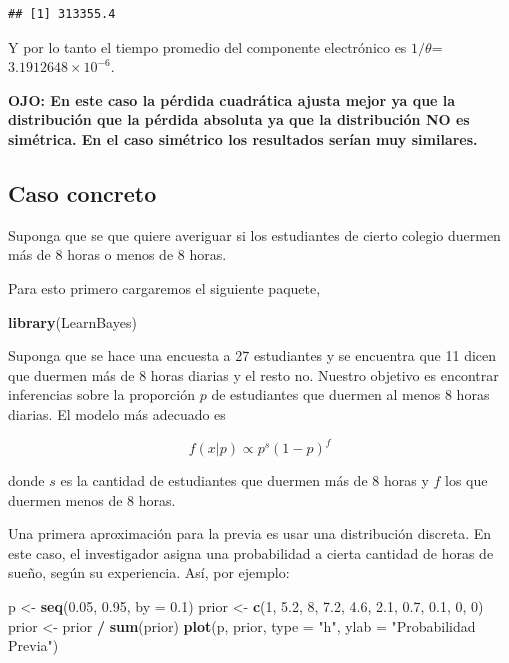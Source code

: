 \documentclass[
  12pt,
]{book}
\newenvironment{Shaded}{\begin{snugshade}}{\end{snugshade}}
\newcommand{\DataTypeTok}[1]{\textcolor[rgb]{0.13,0.29,0.53}{#1}}
\newcommand{\DecValTok}[1]{\textcolor[rgb]{0.00,0.00,0.81}{#1}}
\newcommand{\FloatTok}[1]{\textcolor[rgb]{0.00,0.00,0.81}{#1}}
\newcommand{\KeywordTok}[1]{\textcolor[rgb]{0.13,0.29,0.53}{\textbf{#1}}}
\newcommand{\NormalTok}[1]{#1}
\newcommand{\OperatorTok}[1]{\textcolor[rgb]{0.81,0.36,0.00}{\textbf{#1}}}
\newcommand{\StringTok}[1]{\textcolor[rgb]{0.31,0.60,0.02}{#1}}
\begin{document}
\begin{verbatim}
## [1] 313355.4
\end{verbatim}

Y por lo tanto el tiempo promedio del componente electrónico es \(1/\theta\)=\ensuremath{3.1912648\times 10^{-6}}.

\textbf{OJO: En este caso la pérdida cuadrática ajusta mejor ya que la distribución que la pérdida absoluta ya que la distribución NO es simétrica. En el caso simétrico los resultados serían muy similares.}

\hypertarget{caso-concreto}{%
\subsection{Caso concreto}\label{caso-concreto}}

Suponga que se que quiere averiguar si los estudiantes de cierto colegio duermen más de 8 horas o menos de 8 horas.

Para esto primero cargaremos el siguiente paquete,

\begin{Shaded}
\begin{Highlighting}[]
\KeywordTok{library}\NormalTok{(LearnBayes)}
\end{Highlighting}
\end{Shaded}

Suponga que se hace una encuesta a 27 estudiantes y se encuentra que 11 dicen que duermen más de 8 horas diarias y el resto no. Nuestro objetivo es encontrar inferencias sobre la proporción \(p\) de estudiantes que duermen al menos 8 horas diarias. El modelo más adecuado es

\[
f(x \vert p) \propto p^s (1-p)^f
\]

donde \(s\) es la cantidad de estudiantes que duermen más de 8 horas y \(f\) los que duermen menos de 8 horas.

Una primera aproximación para la previa es usar una distribución discreta. En este caso, el investigador asigna una probabilidad a cierta cantidad de horas de sueño, según su experiencia. Así, por ejemplo:

\begin{Shaded}
\begin{Highlighting}[]
\NormalTok{p \textless{}{-}}\StringTok{ }\KeywordTok{seq}\NormalTok{(}\FloatTok{0.05}\NormalTok{, }\FloatTok{0.95}\NormalTok{, }\DataTypeTok{by =} \FloatTok{0.1}\NormalTok{)}
\NormalTok{prior \textless{}{-}}\StringTok{ }\KeywordTok{c}\NormalTok{(}\DecValTok{1}\NormalTok{, }\FloatTok{5.2}\NormalTok{, }\DecValTok{8}\NormalTok{, }\FloatTok{7.2}\NormalTok{, }\FloatTok{4.6}\NormalTok{, }\FloatTok{2.1}\NormalTok{, }\FloatTok{0.7}\NormalTok{, }\FloatTok{0.1}\NormalTok{, }\DecValTok{0}\NormalTok{, }\DecValTok{0}\NormalTok{)}
\NormalTok{prior \textless{}{-}}\StringTok{ }\NormalTok{prior }\OperatorTok{/}\StringTok{ }\KeywordTok{sum}\NormalTok{(prior)}
\KeywordTok{plot}\NormalTok{(p, prior, }\DataTypeTok{type =} \StringTok{"h"}\NormalTok{, }\DataTypeTok{ylab =} \StringTok{"Probabilidad Previa"}\NormalTok{)}
\end{Highlighting}
\end{Shaded}
\end{document}
